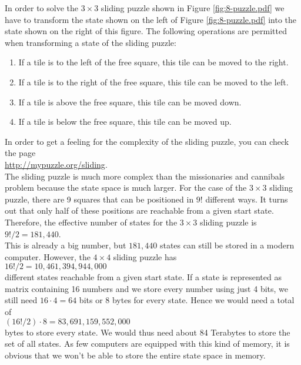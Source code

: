 In order to solve the $3 \times 3$ sliding puzzle shown in Figure \ref{fig:8-puzzle.pdf} we have to
transform the state shown on the left of Figure \ref{fig:8-puzzle.pdf} into the state shown on the
right of this figure.  The following operations are permitted when transforming a state of the
sliding puzzle:
\begin{enumerate}
\item If a tile is to the left  of the free square, this tile can be moved to the right.
\item If a tile is to the right of the free square, this tile can be moved to the left.
\item If a tile is above           the free square, this tile can be moved down.
\item If a tile is below           the free square, this tile can be moved up.
\end{enumerate}
In order to get a feeling for the complexity of the sliding puzzle, you can check the page
\\[0.2cm]
\hspace*{1.3cm}
\href{http://mypuzzle.org/sliding}{http://mypuzzle.org/sliding}.
\\[0.2cm]
The sliding puzzle is much more complex than the missionaries and cannibals problem because the
state space is much larger.  For the case of the $3 \times 3$ sliding puzzle, there are 9 squares
that can be positioned in $9!$ different ways.  It turns out that only half of these positions are
reachable from a given start state.  Therefore, the effective number of states for the $3 \times 3$
sliding puzzle is
\\[0.2cm]
\hspace*{1.3cm}
$9! / 2 = 181,440$.
\\[0.2cm]
This is already a big number, but $181,440$ states can still be stored in a modern computer.  However, the
$4 \times 4$ sliding puzzle has
\\[0.2cm]
\hspace*{1.3cm}
$16!/2 = 10,461,394,944,000$
\\[0.2cm]
different states reachable from a given start state.  If a state is represented as matrix containing
16 numbers and we store every number using just 4 bits, we still need $16 \cdot 4 = 64$ bits or 8
bytes for every state.  Hence we would need a total of
\\[0.2cm]
\hspace*{1.3cm}
$(16! / 2) \cdot 8 = 83,691,159,552,000$
\\[0.2cm]
bytes to store every state. We would thus need about 84 Terabytes to store the set of all states.  As few
computers are equipped with this kind of memory, it is obvious that we won't be able to store the
entire state space in memory.

